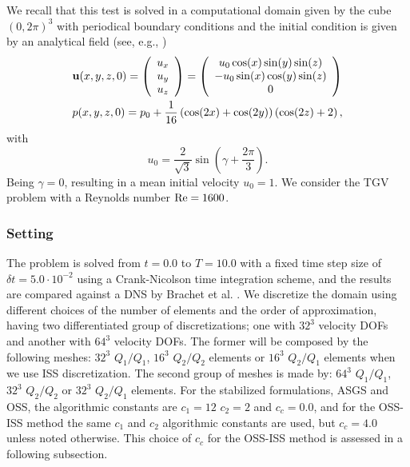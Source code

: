 We recall that this test is solved in a computational domain given by the cube $(0,2\pi)^3$ with periodical boundary conditions and the initial condition is given by an analytical field (see, e.g., \cite{brachet_direct_1991})
\begin{align}
\label{eq:ini_sol_TG}
&{\bf u}(x,y,z,0)=\left(\begin{array}{c}
u_x\\
u_y\\
u_z
\end{array}\right)=\left(\begin{array}{c}
u_0\cos(x)\sin(y)\sin(z)\\
-u_0\sin(x)\cos(y)\sin(z)\\
0
\end{array}\right)\\\nonumber
&p(x,y,z,0)=p_0+\frac{1}{16}\left(\cos(2x)+\cos(2y)\right)\left(\cos(2z)+2\right),
\end{align}
with
$$u_0=\frac{2}{\sqrt{3}}\sin\left(\gamma+\frac{2\pi}{3}\right).$$
Being $\gamma=0$, resulting in a mean initial velocity  $u_0=1$. We consider the TGV problem with a Reynolds number ${\rm Re}=1600$.

\subsubsection{Setting}
\label{subsubsec-C5_TFV_setting}
The problem is solved from $t=0.0$ to $T=10.0$ with a fixed time step size of $\delta t=5.0\cdot10^{-2}$ using a Crank-Nicolson time integration scheme, and the results are compared against a DNS by Brachet et al. \cite{brachet_direct_1991}. We discretize the domain using different choices of the number of elements and the order of approximation, having two differentiated group of discretizations; one with $32^3$ velocity DOFs and another with $64^3$ velocity DOFs. The former will be composed by the following meshes: $32^3$ $Q_1/Q_1$, $16^3$ $Q_2/Q_2$ elements or $16^3$ $Q_2/Q_1$ elements when we use ISS discretization. The second group of meshes is made by: $64^3$ $Q_1/Q_1$, $32^3$ $Q_2/Q_2$ or $32^3$ $Q_2/Q_1$ elements. For the stabilized formulations, ASGS and OSS, the algorithmic constants are $c_1=12$ $c_2=2$ and $c_c=0.0$, and for the OSS-ISS method the same $c_1$ and $c_2$ algorithmic constants are used, but $c_c=4.0$ unless noted otherwise. This choice of $c_c$ for the OSS-ISS method is assessed in a following subsection.

